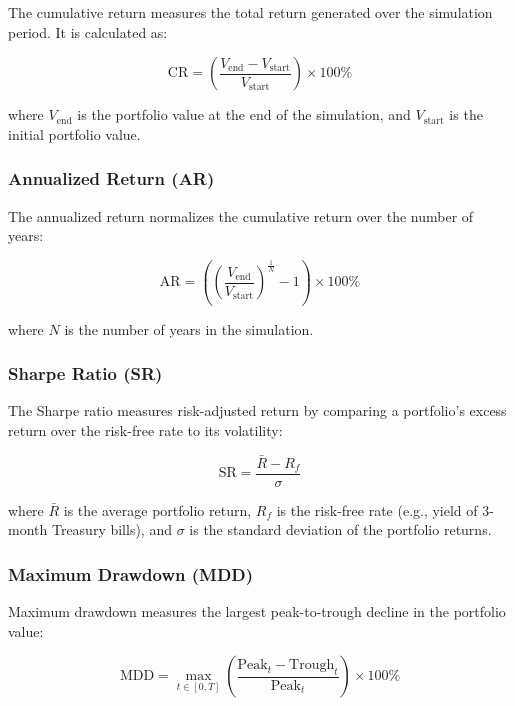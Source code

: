 The cumulative return measures the total return generated over the simulation period. It is calculated as:

\begin{equation}
\text{CR} = \left( \frac{V_{\text{end}} - V_{\text{start}}}{V_{\text{start}}} \right) \times 100\%
\end{equation}

where $V_{\text{end}}$ is the portfolio value at the end of the simulation, and $V_{\text{start}}$ is the initial portfolio value.

\subsubsection{Annualized Return (AR)}

The annualized return normalizes the cumulative return over the number of years:

\begin{equation}
\text{AR} = \left( \left( \frac{V_{\text{end}}}{V_{\text{start}}} \right)^{\frac{1}{N}} - 1 \right) \times 100\%
\end{equation}

where $N$ is the number of years in the simulation.

\subsubsection{Sharpe Ratio (SR)}

The Sharpe ratio measures risk-adjusted return by comparing a portfolio's excess return over the risk-free rate to its volatility:

\begin{equation}
\text{SR} = \frac{\bar{R} - R_f}{\sigma}
\end{equation}

where $\bar{R}$ is the average portfolio return, $R_f$ is the risk-free rate (e.g., yield of 3-month Treasury bills), and $\sigma$ is the standard deviation of the portfolio returns.

\subsubsection{Maximum Drawdown (MDD)}

Maximum drawdown measures the largest peak-to-trough decline in the portfolio value:

\begin{equation}
\text{MDD} = \max_{t \in [0, T]} \left( \frac{\text{Peak}_t - \text{Trough}_t}{\text{Peak}_t} \right) \times 100\%
\end{equation}





